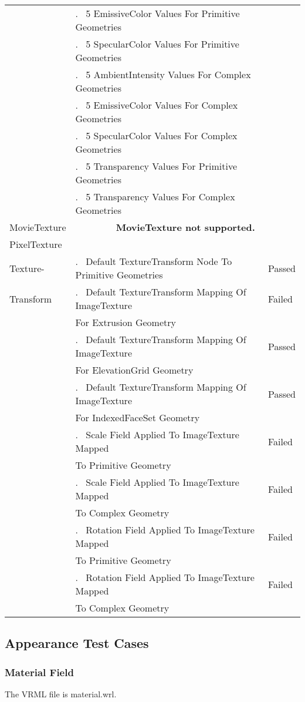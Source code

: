\documentclass[12pt,letterpaper]{article}
\newcounter{testCaseCtr}
\newcommand{\testCase}{\arabic{testCaseCtr}.~ \stepcounter{testCaseCtr}}
\newcommand{\resetTestCase}{\setcounter{testCaseCtr}{1}}
\newcommand{\AppA}{Material Field}
\newcommand{\MatW}{5 EmissiveColor Values For Primitive Geometries}
\newcommand{\MatX}{5 SpecularColor Values For Primitive Geometries}
\newcommand{\MatY}{5 AmbientIntensity Values For Complex Geometries}
\newcommand{\MatZ}{5 EmissiveColor Values For Complex Geometries}
\newcommand{\MatAA}{5 SpecularColor Values For Complex Geometries}
\newcommand{\MatAB}{5 Transparency Values For Primitive Geometries}
\newcommand{\MatAC}{5 Transparency Values For Complex Geometries}
\newcommand{\TTA}{Default TextureTransform Node To Primitive Geometries}
\newcommand{\TTBa}{Default TextureTransform Mapping Of ImageTexture}
\newcommand{\TTBb}{For Extrusion Geometry}
\newcommand{\TTCa}{Default TextureTransform Mapping Of ImageTexture}
\newcommand{\TTCb}{For ElevationGrid Geometry}
\newcommand{\TTDa}{Default TextureTransform Mapping Of ImageTexture}
\newcommand{\TTDb}{For IndexedFaceSet Geometry}
\newcommand{\TTEa}{Scale Field Applied To ImageTexture Mapped}
\newcommand{\TTEb}{To Primitive Geometry}
\newcommand{\TTFa}{Scale Field Applied To ImageTexture Mapped}
\newcommand{\TTFb}{To Complex Geometry}
\newcommand{\TTGa}{Rotation Field Applied To ImageTexture Mapped}
\newcommand{\TTGb}{To Primitive Geometry}
\newcommand{\TTHa}{Rotation Field Applied To ImageTexture Mapped}
\newcommand{\TTHb}{To Complex Geometry}
\begin{document}
\begin{center}
\begin{longtable}{|l|l|l|}
 & \testCase \MatW & \\\cline{2-3}
 & \testCase \MatX & \\\cline{2-3}
 & \testCase \MatY & \\\cline{2-3}
 & \testCase \MatZ & \\\cline{2-3}
 & \testCase \MatAA & \\\cline{2-3}
 & \testCase \MatAB & \\\cline{2-3}
 & \testCase \MatAC & \\\hline
\resetTestCase
MovieTexture & \multicolumn{2}{|c|}{\textbf{MovieTexture not supported.}}\\\hline
\resetTestCase
PixelTexture & & \\\hline
\resetTestCase
Texture- & \testCase \TTA & Passed \\\cline{2-3}
Transform & \testCase \TTBa & Failed \\
 & \TTBb & \\\cline{2-3}
 & \testCase \TTCa & Passed \\
 & \TTCb & \\\cline{2-3}
 & \testCase \TTDa & Passed \\
 & \TTDb & \\\cline{2-3}
 & \testCase \TTEa & Failed \\
 & \TTEb & \\\cline{2-3}
 & \testCase \TTFa & Failed \\
 & \TTFb & \\\cline{2-3}
 & \testCase \TTGa & Failed \\
 & \TTGb & \\\cline{2-3}
 & \testCase \TTHa & Failed \\
 & \TTHb & \\\cline{2-3}
\end{longtable}
\end{center}

\subsection{Appearance Test Cases}

\subsubsection{\AppA}
The VRML file is material.wrl.
\end{document}
